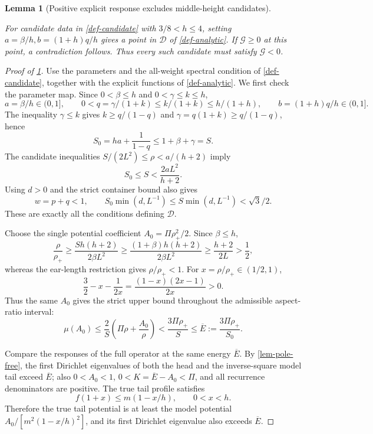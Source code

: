 \documentclass[11pt,a4paper]{article}
\theoremstyle{proofmanuscript}
\newtheorem{lemma}[theorem]{Lemma}
\begin{document}
\begin{lemma}[Positive explicit response excludes middle-height candidates]\label{lem-robin}

For candidate data in \ref{def-candidate} with \(3/8<h\le4\), setting \(a=\beta/h,b=(1+h)q/h\) gives a point in \(\mathcal D\) of \ref{def-analytic}. If \(\mathcal G\ge0\) at this point, a contradiction follows. Thus every such candidate must satisfy \(\mathcal G<0\).

\end{lemma}

\begin{proof}[Proof of \ref{lem-robin}]

Use the parameters and the all-weight spectral condition of \ref{def-candidate}, together with the explicit functions of \ref{def-analytic}. We first check the parameter map. Since \(0<\beta\le h\) and \(0<\gamma\le k\le h\), \[
a=\beta/h\in(0,1],\qquad
0<q=\gamma/(1+k)\le k/(1+k)\le h/(1+h),
\qquad b=(1+h)q/h\in(0,1].
\] The inequality \(\gamma\le k\) gives \(k\ge q/(1-q)\) and \(\gamma=q(1+k)\ge q/(1-q)\), hence \[
S_0=ha+\frac1{1-q}\le1+\beta+\gamma=S.
\] The candidate inequalities \(S/(2L^2)\le\rho<a/(h+2)\) imply \[
S_0\le S<\frac{2aL^2}{h+2}.
\] Using \(d>0\) and the strict container bound also gives \[
w=p+q<1,\qquad S_0\min(d,L^{-1})\le S\min(d,L^{-1})<\sqrt3/2.
\] These are exactly all the conditions defining \(\mathcal D\).

Choose the single potential coefficient \(A_0=\Pi\rho_+^2/2\). Since \(\beta\le h\), \[
\frac\rho{\rho_+}\ge\frac{Sh(h+2)}{2\beta L^2}
\ge\frac{(1+\beta)h(h+2)}{2\beta L^2}
\ge\frac{h+2}{2L}>\frac12,
\] whereas the ear-length restriction gives \(\rho/\rho_+<1\). For \(x=\rho/\rho_+\in(1/2,1)\), \[
\frac32-x-\frac1{2x}=\frac{(1-x)(2x-1)}{2x}>0.
\] Thus the same \(A_0\) gives the strict upper bound throughout the admissible aspect-ratio interval: \[
\mu(A_0)\le\frac2S\left(\Pi\rho+\frac{A_0}{\rho}\right)
<\frac{3\Pi\rho_+}{S}\le\overline E:=\frac{3\Pi\rho_+}{S_0}.\tag{R.3.3}
\]

Compare the responses of the full operator at the same energy \(\overline E\). By \ref{lem-pole-free}, the first Dirichlet eigenvalues of both the head and the inverse-square model tail exceed \(\overline E\); also \(0<A_0<1\), \(0<K=\overline E-A_0<\Pi\), and all recurrence denominators are positive. The true tail profile satisfies \[
f(1+x)\le m(1-x/h),\qquad 0<x<h.
\] Therefore the true tail potential is at least the model potential \(A_0/[m^2(1-x/h)^2]\), and its first Dirichlet eigenvalue also exceeds \(\overline E\).


\end{proof}
\end{document}
